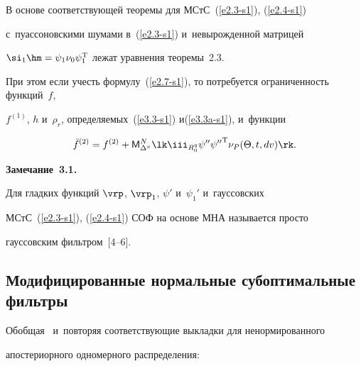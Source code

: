 \vspace*{-2pt}



В основе соответствующей теоремы для МСтС~(\ref{e2.3-s1}), (\ref{e2.4-s1}) 

с~пуассоновскими шумами в~(\ref{e2.3-s1}) и~невырожденной матрицей 

$\si_1\hm=\psi_1 \nu_0 \psi_1^{\mathrm{T}}$ лежат уравнения теоремы~2.3. 




При этом если учесть формулу~(\ref{e2.7-s1}), то потребуется ограниченность функций~$f$, 

$f^{(1)}$, $h$ и~$\rho_r$, определяемых~(\ref{e3.3-s1}) и(\ref{e3.3a-s1}), и~функции

\begin{equation*}

\bar f^{(2)}=f^{(2)}+ {\sf M}_{\Delta^x}^N \lk %

\iii_{R_0^q} 

\psi''{\psi''}^{\mathrm{T}} \nu_P (\Theta, t, dv)\rk %

.


\end{equation*}



\noindent

\textbf{Замечание~3.1.}\

Для гладких функций $\vrp$, $\vrp_1$, $\psi'$ и~$\psi_1'$ и~гауссовских 

МСтС~(\ref{e2.3-s1}), (\ref{e2.4-s1}) СОФ на основе МНА называется просто 

гауссовским фильтром~[4--6]. %



\smallskip



\subsection{Модифицированные нормальные субоптимальные фильтры}



Обобщая~\cite{8-s1} и~повторяя  соответствующие выкладки для ненормированного 

апостериорного одномерного распределения:

